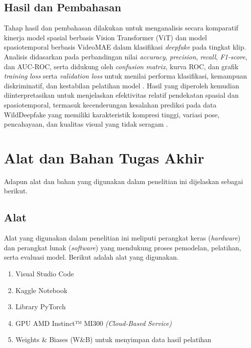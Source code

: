 \subsection{Hasil dan Pembahasan} \label{III.Hasil dan Pembahasan}
Tahap hasil dan pembahasan dilakukan untuk menganalisis secara komparatif kinerja model spasial berbasis Vision Transformer (ViT) dan model spasiotemporal berbasis VideoMAE dalam klasifikasi \textit{deepfake} pada tingkat klip. Analisis didasarkan pada perbandingan nilai \textit{accuracy}, \textit{precision}, \textit{recall}, \textit{F1-score}, dan AUC-ROC, serta didukung oleh \textit{confusion matrix}, kurva ROC, dan grafik \textit{training loss} serta \textit{validation loss} untuk menilai performa klasifikasi, kemampuan diskriminatif, dan kestabilan pelatihan model \cite{SOKOLOVA2009427,FAWCETT2006861,lu2022novelframeworkassessmentlearningbased}. Hasil yang diperoleh kemudian diinterpretasikan untuk menjelaskan efektivitas relatif pendekatan spasial dan spasiotemporal, termasuk kecenderungan kesalahan prediksi pada data WildDeepfake yang memiliki karakteristik kompresi tinggi, variasi pose, pencahayaan, dan kualitas visual yang tidak seragam \cite{Haliassos2021,Zi2024,chu2025reducedspatialdependencygeneral}. \par

\section{Alat dan Bahan Tugas Akhir} \label{III.Alat dan Bahan}
Adapun alat dan bahan yang digunakan dalam penelitian ini dijelaskan sebagai berikut. \par

\subsection{Alat} \label{III.Alat}
Alat yang digunakan dalam penelitian ini meliputi perangkat keras (\textit{hardware}) dan perangkat lunak (\textit{software}) yang mendukung proses pemodelan, pelatihan, serta evaluasi model. Berikut adalah alat yang digunakan. \par
\begin{enumerate}[noitemsep]
	\item Visual Studio Code
	\item Kaggle Notebook
	\item Library PyTorch
	\item GPU AMD Instinct™ MI300 \textit{(Cloud-Based Service)} 
	\item Weights \& Biases (W\&B) untuk menyimpan data hasil pelatihan
\end{enumerate}


